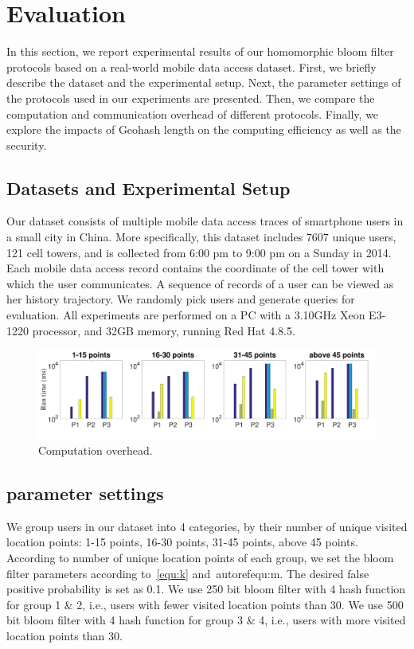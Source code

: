 \section{Evaluation}
\label{sec:evaluation}

In this section, we report experimental results of our homomorphic bloom filter protocols based on a real-world mobile data access dataset. First, we briefly describe the dataset and the experimental setup. Next, the parameter settings of the protocols used in our experiments are presented. Then, we compare the computation and communication overhead of different protocols. Finally, we explore the impacts of Geohash length on the computing efficiency as well as the security.

\subsection{Datasets and Experimental Setup}
Our dataset consists of multiple mobile data access traces of smartphone users in a small city in China. More specifically, this dataset includes 7607 unique users, 121 cell towers, and is collected from 6:00 pm to 9:00 pm on a Sunday in 2014. Each mobile data access record contains the coordinate of the cell tower with which the user communicates. A sequence of records of a user can be viewed as her history trajectory. We randomly pick users and generate queries for evaluation. All experiments are performed on a PC with a 3.10GHz Xeon E3-1220 processor, and 32GB memory,
running Red Hat 4.8.5.

\begin{figure}[t]
	\centering
	\includegraphics[width=\linewidth]{figures/computation_oh.pdf}
	\caption{Computation overhead.}
	\label{fig:computation_oh}
\end{figure}

\subsection{parameter settings}
We group users in our dataset into 4 categories, by their number of unique visited location points: 1-15 points, 16-30 points, 31-45 points, above 45 points. According to number of unique location points of each group, we set the bloom filter parameters according to~\autoref{equ:k} and~autoref{equ:m}. The desired false positive probability is set as 0.1. We use 250 bit bloom filter with 4 hash function for group 1 \& 2, i.e., users with fewer visited location points than 30. We use 500 bit bloom filter with 4 hash function for group 3 \& 4, i.e., users with more visited location points than 30.

